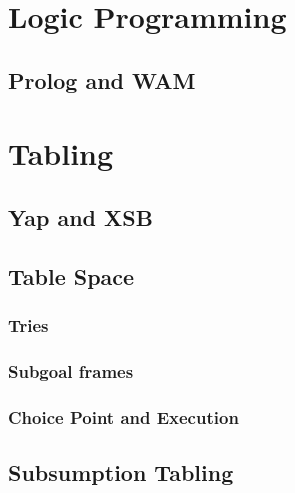 \section{Logic Programming}
  \subsection{Prolog and WAM}

\section{Tabling}
  \subsection{Yap and XSB}
  \subsection{Table Space}
    \subsubsection{Tries}
    \subsubsection{Subgoal frames}
    \subsubsection{Choice Point and Execution}
  \subsection{Subsumption Tabling}